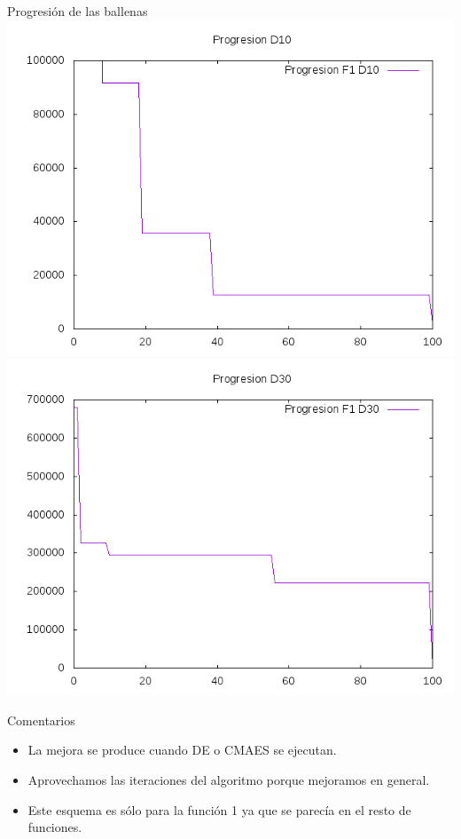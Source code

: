 \documentclass[10pt]{beamer}
\begin{document}
	\begin{frame}[fragile]{Progresión de las ballenas}
		\centering
		\includegraphics[scale=0.25]{./Imagenes/Progresion/progresion_mejores_10.png}
		\includegraphics[scale=0.25]{./Imagenes/Progresion/progresion_mejores_30.png}
		
		\begin{block}{Comentarios}
			\begin{itemize}
				\item La mejora se produce cuando DE o CMAES se ejecutan.
				\item Aprovechamos las iteraciones del algoritmo porque mejoramos en general.
				\item Este esquema es sólo para la función 1 ya que se parecía en el resto de funciones.
			\end{itemize}
		\end{block}
	\end{frame}
\end{document}
